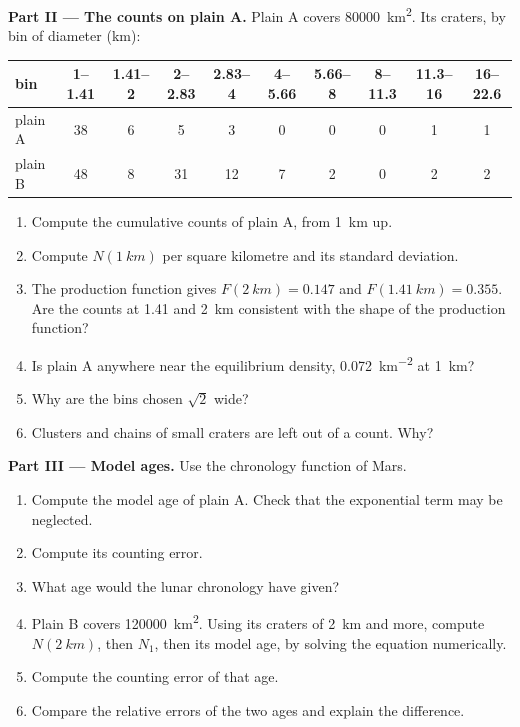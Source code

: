 \begin{problem}
\medskip\noindent\textbf{Part II --- The counts on plain A.} Plain A
covers \qty{80000}{km^2}. Its craters, by bin of diameter (km):
\begin{center}
\small
\begin{tabular}{lccccccccc}
\hline
bin & 1--1.41 & 1.41--2 & 2--2.83 & 2.83--4 & 4--5.66 & 5.66--8 & 8--11.3 & 11.3--16 & 16--22.6 \\
\hline
plain A & 38 & 6 & 5 & 3 & 0 & 0 & 0 & 1 & 1 \\
plain B & 48 & 8 & 31 & 12 & 7 & 2 & 0 & 2 & 2 \\
\hline
\end{tabular}
\end{center}
\begin{enumerate}[resume]
\item Compute the cumulative counts of plain A, from \qty{1}{km} up.
\item Compute $N(\qty{1}{km})$ per square kilometre and its standard
  deviation.
\item The production function gives $F(\qty{2}{km}) = 0.147$ and
  $F(\qty{1.41}{km}) = 0.355$. Are the counts at 1.41 and \qty{2}{km}
  consistent with the shape of the production function?
\item Is plain A anywhere near the equilibrium density,
  \qty{0.072}{km^{-2}} at \qty{1}{km}?
\item Why are the bins chosen $\sqrt2$ wide?
\item Clusters and chains of small craters are left out of a count. Why?
\end{enumerate}

\medskip\noindent\textbf{Part III --- Model ages.} Use the chronology
function of Mars.
\begin{enumerate}[resume]
\item Compute the model age of plain A. Check that the exponential term
  may be neglected.
\item Compute its counting error.
\item What age would the lunar chronology have given?
\item Plain B covers \qty{120000}{km^2}. Using its craters of \qty{2}{km}
  and more, compute $N(\qty{2}{km})$, then $N_1$, then its model age, by
  solving the equation numerically.
\item Compute the counting error of that age.
\item Compare the relative errors of the two ages and explain the
  difference.
\end{enumerate}


\end{problem}
